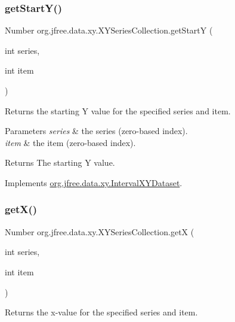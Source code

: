 \subsubsection{\texorpdfstring{get\+Start\+Y()}{getStartY()}}
{\footnotesize\ttfamily Number org.\+jfree.\+data.\+xy.\+X\+Y\+Series\+Collection.\+get\+StartY (\begin{DoxyParamCaption}\item[{int}]{series,  }\item[{int}]{item }\end{DoxyParamCaption})}

Returns the starting Y value for the specified series and item.


\begin{DoxyParams}{Parameters}
{\em series} & the series (zero-\/based index). \\
\hline
{\em item} & the item (zero-\/based index).\\
\hline
\end{DoxyParams}
\begin{DoxyReturn}{Returns}
The starting Y value. 
\end{DoxyReturn}


Implements \mbox{\hyperlink{interfaceorg_1_1jfree_1_1data_1_1xy_1_1_interval_x_y_dataset_afdd414735adb233734bc35b76a005ed9}{org.\+jfree.\+data.\+xy.\+Interval\+X\+Y\+Dataset}}.

\mbox{\label{classorg_1_1jfree_1_1data_1_1xy_1_1_x_y_series_collection_ad5ddad3a50f77de286608767e874e396}} 
\subsubsection{\texorpdfstring{get\+X()}{getX()}}
{\footnotesize\ttfamily Number org.\+jfree.\+data.\+xy.\+X\+Y\+Series\+Collection.\+getX (\begin{DoxyParamCaption}\item[{int}]{series,  }\item[{int}]{item }\end{DoxyParamCaption})}

Returns the x-\/value for the specified series and item.


